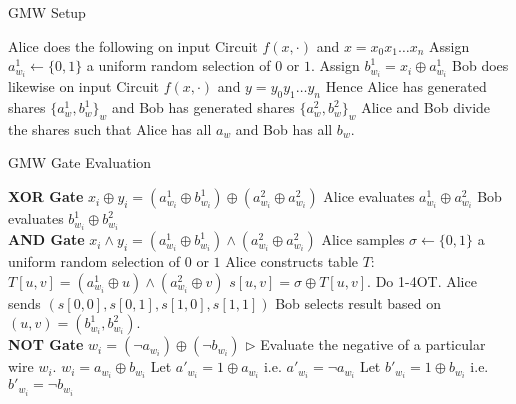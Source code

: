 \begin{algorithm}[h!]
\caption{GMW Setup}
\label{alg:gmw_setup}
\begin{algorithmic}
    \State Alice does the following on input Circuit $f(x,\cdot)$ and $x = x_0x_1\ldots x_n$
        \State Assign $a^1_{w_i} \leftarrow \{0,1\}$
        \Comment a uniform random selection of $0$ or $1$.
        \State Assign $b^1_{w_i} = x_i \oplus a_{w_i}^1$
    \EndFor
    \State Bob does likewise on input Circuit $f(x,\cdot)$ and $y = y_0y_1\ldots y_n$
    \State Hence Alice has generated shares $\{a^1_w, b^1_w\}_w$ 
    \State and Bob has generated shares $\{a^2_w, b^2_w\}_w$
    \State Alice and Bob divide the shares such that Alice has all $a_w$ and Bob has all $b_w$.
\end{algorithmic}
\end{algorithm}

\begin{algorithm}
\caption{GMW Gate Evaluation}
\label{alg:gmw_gates}
\begin{algorithmic}
    \State \textbf{XOR Gate}
    \Comment $x_i \oplus y_i = (a_{w_i}^1 \oplus b_{w_i}^1) \oplus (a_{w_i}^2 \oplus a_{w_i}^2)$
    \State Alice evaluates $a_{w_i}^1 \oplus a_{w_i}^2$
    \State Bob evaluates $b_{w_i}^1 \oplus b_{w_i}^2$
    \\
    
    \State \textbf{AND Gate}
    \Comment $x_i \wedge y_i = (a_{w_i}^1 \oplus b_{w_i}^1) \wedge (a_{w_i}^2 \oplus a_{w_i}^2)$
    \State Alice samples $\sigma \leftarrow \{0,1\}$
    \Comment a uniform random selection of $0$ or $1$
    \State Alice constructs table $T$:
     	\State $T[u,v] = (a^1_{w_i} \oplus u) \wedge (a^2_{w_i} \oplus v)$
	\State $s[u,v] = \sigma \oplus T[u,v]$.
     \EndFor    
     \State Do 1-4OT. Alice sends $(s[0,0], s[0,1], s[1,0], s[1,1])$ 
     \State Bob selects result based on $(u,v) = (b^1_{w_i}, b^2_{w_i})$.
    \\
    
    \State \textbf{NOT Gate}
    \Comment $w_i = (\neg a_{w_i}) \oplus (\neg b_{w_i})$
    \State $\triangleright$ Evaluate the negative of a particular wire $w_i$. 
    \State $w_i = a_{w_i} \oplus b_{w_i}$
    \State Let $a'_{w_i} = 1 \oplus a_{w_i}$
    \Comment i.e. $a'_{w_i} = \neg a_{w_i}$
    \State Let $b'_{w_i} = 1 \oplus b_{w_i}$
    \Comment i.e. $b'_{w_i} = \neg b_{w_i}$
\end{algorithmic}
\end{algorithm}

